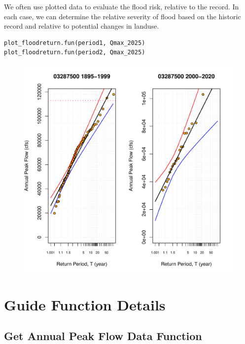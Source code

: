 \documentclass{tufte-handout}\usepackage[]{graphicx}\usepackage[]{xcolor}
\makeatletter
\def\maxwidth{ %
  \ifdim\Gin@nat@width>\linewidth
    \linewidth
  \else
    \Gin@nat@width
  \fi
}
\newenvironment{knitrout}{}{} %
\makeatother
\begin{document}
We often use plotted data to evaluate the flood risk, relative to the record. In 
each case, we can determine the relative severity of flood based on the historic
record and relative to potential changes in landuse.

\begin{verbatim}
plot_floodreturn.fun(period1, Qmax_2025)
plot_floodreturn.fun(period2, Qmax_2025)
\end{verbatim}

\begin{figure}[h]
\begin{knitrout}
\color{fgcolor}
\includegraphics[width=\maxwidth]{figure/unnamed-chunk-20-1} 
\end{knitrout}
\end{figure}

\clearpage

\section{Guide Function Details}

\subsection{Get Annual Peak Flow Data Function}
\end{document}
